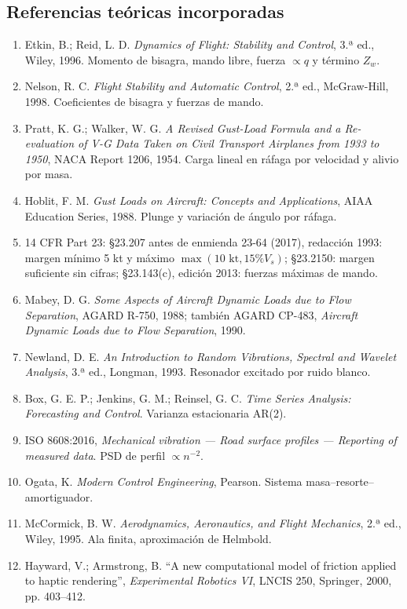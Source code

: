 \documentclass[11pt,a4paper]{article}
\begin{document}
\subsection{Referencias teóricas incorporadas}
\begin{enumerate}
\item Etkin, B.; Reid, L. D. \textit{Dynamics of Flight: Stability and Control}, 3.ª ed., Wiley, 1996. Momento de bisagra, mando libre, fuerza $\propto q$ y término $Z_w$.
\item Nelson, R. C. \textit{Flight Stability and Automatic Control}, 2.ª ed., McGraw-Hill, 1998. Coeficientes de bisagra y fuerzas de mando.
\item Pratt, K. G.; Walker, W. G. \textit{A Revised Gust-Load Formula and a Re-evaluation of V-G Data Taken on Civil Transport Airplanes from 1933 to 1950}, NACA Report 1206, 1954. Carga lineal en ráfaga por velocidad y alivio por masa.
\item Hoblit, F. M. \textit{Gust Loads on Aircraft: Concepts and Applications}, AIAA Education Series, 1988. Plunge y variación de ángulo por ráfaga.
\item 14 CFR Part 23: §23.207 antes de enmienda 23-64 (2017), redacción 1993: margen mínimo 5 kt y máximo $\max(10\text{ kt},15\%V_s)$; §23.2150: margen suficiente sin cifras; §23.143(c), edición 2013: fuerzas máximas de mando.
\item Mabey, D. G. \textit{Some Aspects of Aircraft Dynamic Loads due to Flow Separation}, AGARD R-750, 1988; también AGARD CP-483, \textit{Aircraft Dynamic Loads due to Flow Separation}, 1990.
\item Newland, D. E. \textit{An Introduction to Random Vibrations, Spectral and Wavelet Analysis}, 3.ª ed., Longman, 1993. Resonador excitado por ruido blanco.
\item Box, G. E. P.; Jenkins, G. M.; Reinsel, G. C. \textit{Time Series Analysis: Forecasting and Control}. Varianza estacionaria AR(2).
\item ISO 8608:2016, \textit{Mechanical vibration --- Road surface profiles --- Reporting of measured data}. PSD de perfil $\propto n^{-2}$.
\item Ogata, K. \textit{Modern Control Engineering}, Pearson. Sistema masa--resorte--amortiguador.
\item McCormick, B. W. \textit{Aerodynamics, Aeronautics, and Flight Mechanics}, 2.ª ed., Wiley, 1995. Ala finita, aproximación de Helmbold.
\item Hayward, V.; Armstrong, B. ``A new computational model of friction applied to haptic rendering'', \textit{Experimental Robotics VI}, LNCIS 250, Springer, 2000, pp. 403--412.

\end{enumerate}
\end{document}
